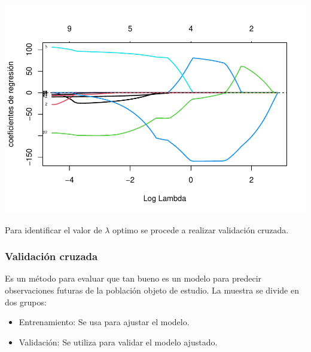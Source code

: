 \documentclass[
]{article}
\newenvironment{Shaded}{\begin{snugshade}}{\end{snugshade}}
\newcommand{\AttributeTok}[1]{\textcolor[rgb]{0.77,0.63,0.00}{#1}}
\newcommand{\DecValTok}[1]{\textcolor[rgb]{0.00,0.00,0.81}{#1}}
\newcommand{\FunctionTok}[1]{\textcolor[rgb]{0.00,0.00,0.00}{#1}}
\newcommand{\NormalTok}[1]{#1}
\newcommand{\OtherTok}[1]{\textcolor[rgb]{0.56,0.35,0.01}{#1}}
\newcommand{\SpecialCharTok}[1]{\textcolor[rgb]{0.00,0.00,0.00}{#1}}
\begin{document}
\includegraphics{Taller-2-Regresion-Multiple-Aplicada_files/figure-latex/unnamed-chunk-6-1.pdf}

Para identificar el valor de \(\lambda\) optimo se procede a realizar
validación cruzada.

\hypertarget{validaciuxf3n-cruzada}{%
\subsubsection{Validación cruzada}\label{validaciuxf3n-cruzada}}

Es un método para evaluar que tan bueno es un modelo para predecir
observaciones futuras de la población objeto de estudio. La muestra se
divide en dos grupos:

\begin{itemize}
\item
  Entrenamiento: Se usa para ajustar el modelo.
\item
  Validación: Se utiliza para validar el modelo ajustado.
\end{itemize}

\begin{Shaded}
\end{Shaded}
\end{document}
